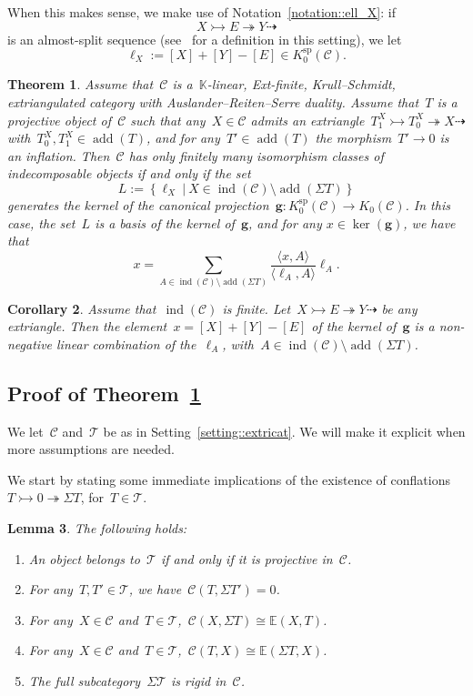 \documentclass{amsart}
\newtheorem{theorem}{Theorem}[section]
\newtheorem{corollary}[theorem]{Corollary}
\newtheorem{lemma}[theorem]{Lemma}
\theoremstyle{definition}
\renewcommand{\b}[1]{{\boldsymbol{#1}}} %
\newcommand{\field}{\mathbb{K}}
\newcommand{\cat}{\mathcal{C}}
\newcommand{\susp}{\Sigma}
\newcommand{\add}{\operatorname{add}}
\newcommand{\spl}{\operatorname{sp}}
\newcommand{\Ksp}{K_0^{\spl}}
\newcommand{\ind}{\operatorname{ind}}
\newcommand{\tc}{\mathcal{T}}
\newcommand{\infl}{\rightarrowtail}
\newcommand{\defl}{\twoheadrightarrow}
\newcommand{\kzero}[1]{K_0(#1)}
\begin{document}
When this makes sense, we make use of Notation~\ref{notation::ell_X}: if
\[
X \infl E \defl Y \dashrightarrow
\]
is an almost-split sequence (see~\cite{IyamaNakaokaPalu} for a definition in this setting), we let
\[
 \ell_X := [X]+[Y]-[E]\in\Ksp(\cat).
\]


\begin{theorem}\label{theorem::extricats}
Assume that~$\cat$ is a~$\field$-linear, Ext-finite, Krull--Schmidt, extriangulated category with Auslander--Reiten--Serre duality.
Assume that~$T$ is a projective object of~$\cat$ such that any~$X\in\cat$ admits an extriangle~$T_1^X\infl T_0^X\defl X\dashrightarrow$ with~$T_0^X, T_1^X\in\add(T)$, and for any~$T'\in\add(T)$ the morphism~$T'\to 0$ is an inflation. Then~$\cat$ has only finitely many isomorphism classes of indecomposable objects if and only if the set
\[
 L:=\left\{\ell_X \ | \ X\in \ind(\cat)\setminus \add(\susp T) \right\}
\]
generates the kernel of the canonical projection~$\b g:\Ksp(\cat) \to \kzero{\cat}$. 
In this case, the set~$L$ is a basis of the kernel of~$\b g$, and for any $x\in \ker(\b g)$, we have that
 \[
  x= \sum_{A\in \ind(\cat) \setminus \add(\susp T)} \frac{\langle x, A \rangle}{\langle \ell_A, A \rangle} \ell_A.
 \]
\end{theorem}

\begin{corollary}
Assume that~$\ind(\cat)$ is finite.
Let~$X\infl E\defl Y\dashrightarrow$ be any extriangle.
Then the element~$x=[X]+[Y]-[E]$ of the kernel of~$\b g$ is a non-negative linear combination of the~$\ell_A$, with~$A\in\ind(\cat)\setminus\add(\susp T)$.
\end{corollary}

\subsection{Proof of Theorem~\ref{theorem::extricats}}
\label{sect::proofs extricats}

We let~$\cat$ and~$\tc$ be as in Setting~\ref{setting::extricat}.
We will make it explicit when more assumptions are needed.

We start by stating some immediate implications of the existence of conflations~$T\infl 0 \defl \susp T$, for~$T\in\tc$.

\begin{lemma}
The following holds:
\begin{enumerate}[{\rm (a)}]
 \item An object belongs to~$\tc$ if and only if it is projective in~$\cat$.
 \item For any~$T,T'\in\tc$, we have~$\cat(T,\susp T')=0$.
 \item For any~$X\in\cat$ and~$T\in\tc$,~$\cat(X,\susp T)\cong\mathbb{E}(X,T)$.
 \item For any~$X\in\cat$ and~$T\in\tc$,~$\cat(T,X)\cong\mathbb{E}(\susp T,X)$.
 \item The full subcategory~$\susp\tc$ is rigid in~$\cat$.
\end{enumerate}
\end{lemma}
\end{document}
